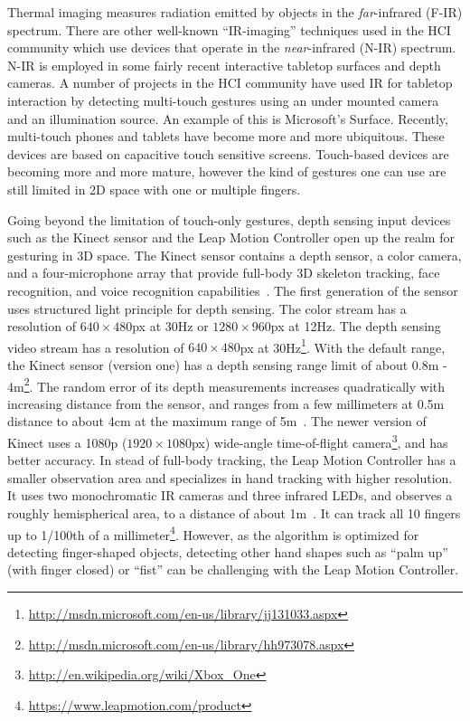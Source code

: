 Thermal imaging measures radiation emitted by objects in the
\textit{far}-infrared (F-IR) spectrum. There are other well-known ``IR-imaging''
techniques used in the HCI community which use devices that operate in the \textit{near}-infrared (N-IR) spectrum.
N-IR is employed in some fairly recent interactive tabletop surfaces and depth
cameras. A number of projects in the HCI community have used IR for tabletop
interaction by detecting multi-touch gestures using an under mounted
camera and an illumination source. An example of this is Microsoft's 
Surface. Recently, multi-touch phones and tablets have become more and more ubiquitous. These devices
are based on capacitive touch sensitive screens. Touch-based devices are
becoming more and more mature, however the kind of gestures one can use are still
limited in 2D space with one or multiple
fingers. 

Going beyond the limitation of touch-only gestures, 
depth sensing input devices such as the Kinect sensor and the Leap Motion
Controller open up the realm for gesturing in 3D space. The Kinect sensor
contains a depth sensor, a color camera, and a four-microphone array that
provide full-body 3D skeleton tracking, face recognition, and voice
recognition capabilities~\cite{zhang12}. The first generation of the sensor
uses structured light principle for depth sensing.
The color stream has a resolution of $640\times
480$px at 30Hz or $1280\times960$px at 12Hz.  The depth sensing video stream has a resolution of $640\times 480$px at
30Hz\footnote{\url{http://msdn.microsoft.com/en-us/library/jj131033.aspx}}. 
With the default range, the Kinect sensor (version one) has a depth sensing
range limit of about 0.8m -
4m\footnote{\url{http://msdn.microsoft.com/en-us/library/hh973078.aspx}}.
The random error of its depth measurements increases quadratically with
increasing distance from the sensor, and ranges from a few millimeters at 0.5m
distance to about 4cm at the maximum range of 5m~\cite{khoshelham2011}. The newer version of Kinect
uses a 1080p ($1920\times 1080$px) wide-angle time-of-flight
camera\footnote{\url{http://en.wikipedia.org/wiki/Xbox_One}}, and has better
accuracy.
In stead of full-body tracking, the Leap Motion Controller has a
smaller observation area and specializes in hand tracking with higher
resolution.
It uses two monochromatic IR cameras and three infrared LEDs, and observes a
roughly hemispherical area, to a distance of about 1m~\cite{leapmotion14}. It
can track all 10 fingers up to 1/100th of a
millimeter\footnote{\url{https://www.leapmotion.com/product}}. However, as
the algorithm is optimized for detecting finger-shaped objects, detecting other
hand shapes such as ``palm up'' (with finger closed) or ``fist'' can be
challenging with the Leap Motion Controller.

